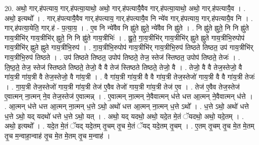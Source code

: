 \documentclass[17pt]{extarticle}
\begin{document}
20. अथो॒ गार्.ह॑पत्याय॒ गार्.ह॑पत्या॒याथो॒ अथो॒ गार्.ह॑पत्यायै॒वैव गार्.ह॑पत्या॒याथो॒ अथो॒ गार्.ह॑पत्यायै॒व । . अथो॒ इत्यथो᳚ । . गार्.ह॑पत्यायै॒वैव गार्.ह॑पत्याय॒ गार्.ह॑पत्यायै॒व नि न्ये॑व गार्.ह॑पत्याय॒ गार्.ह॑पत्यायै॒व नि । . गार्.ह॑पत्या॒येति॒ गार्.ह॑ - प॒त्या॒य॒ । . ए॒व नि न्ये॑वैव नि ह्नु॑ते ह्नुते॒ न्ये॑वैव नि ह्नु॑ते । . नि ह्नु॑ते ह्नुते॒ नि नि ह्नु॑ते गाय॒त्रीभि॑र् गाय॒त्रीभि॑र् ह्नुते॒ नि नि ह्नु॑ते गाय॒त्रीभिः॑ । . ह्नु॒ते॒ गा॒य॒त्रीभि॑र् गाय॒त्रीभि॑र् ह्नुते ह्नुते गाय॒त्रीभि॒रुपोप॑ गाय॒त्रीभि॑र् ह्नुते ह्नुते गाय॒त्रीभि॒रुप॑ । . गा॒य॒त्रीभि॒रुपोप॑ गाय॒त्रीभि॑र् गाय॒त्रीभि॒रुप॑ तिष्ठते तिष्ठत॒ उप॑ गाय॒त्रीभि॑र् गाय॒त्रीभि॒रुप॑ तिष्ठते । . उप॑ तिष्ठते तिष्ठत॒ उपोप॑ तिष्ठते॒ तेज॒ स्तेज॑ स्तिष्ठत॒ उपोप॑ तिष्ठते॒ तेजः॑ । . ति॒ष्ठ॒ते॒ तेज॒ स्तेज॑ स्तिष्ठते तिष्ठते॒ तेजो॒ वै वै तेज॑ स्तिष्ठते तिष्ठते॒ तेजो॒ वै । . तेजो॒ वै वै तेज॒स्तेजो॒ वै गा॑य॒त्री गा॑य॒त्री वै तेज॒स्तेजो॒ वै गा॑य॒त्री । . वै गा॑य॒त्री गा॑य॒त्री वै वै गा॑य॒त्री तेज॒स्तेजो॑ गाय॒त्री वै वै गा॑य॒त्री तेजः॑ । . गा॒य॒त्री तेज॒स्तेजो॑ गाय॒त्री गा॑य॒त्री तेज॑ ए॒वैव तेजो॑ गाय॒त्री गा॑य॒त्री तेज॑ ए॒व । . तेज॑ ए॒वैव तेज॒स्तेज॑ ए॒वात्मन् ना॒त्मन् ने॒व तेज॒स्तेज॑ ए॒वात्मन्न् । . ए॒वात्मन् ना॒त्मन् ने॒वैवात्मन् ध॑त्ते धत्त आ॒त्मन् ने॒वैवात्मन् ध॑त्ते । . आ॒त्मन् ध॑त्ते धत्त आ॒त्मन् ना॒त्मन् ध॒त्ते ऽथो॒ अथो॑ धत्त आ॒त्मन् ना॒त्मन् ध॒त्ते ऽथो᳚ । . ध॒त्ते ऽथो॒ अथो॑ धत्ते ध॒त्ते ऽथो॒ यद् यदथो॑ धत्ते ध॒त्ते ऽथो॒ यत् । . अथो॒ यद् यदथो॒ अथो॒ यदे॒त मे॒तं ॅयदथो॒ अथो॒ यदे॒तम् । . अथो॒ इत्यथो᳚ । . यदे॒त मे॒तं ॅयद् यदे॒तम् तृ॒चम् तृ॒च मे॒तं ॅयद् यदे॒तम् तृ॒चम् । . ए॒तम् तृ॒चम् तृ॒च मे॒त मे॒तम् तृ॒च म॒न्वाहा॒न्वाह॑ तृ॒च मे॒त मे॒तम् तृ॒च म॒न्वाह॑ । \newline
\end{document}
